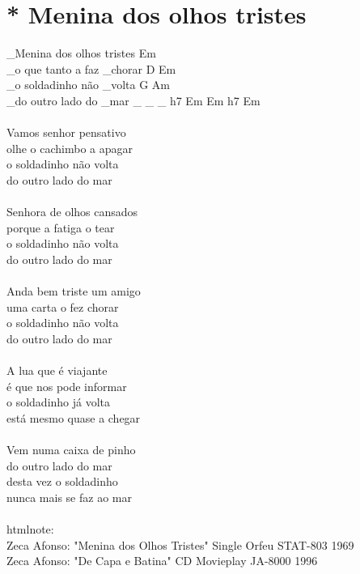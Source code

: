 \documentclass{article}
\begin{document}
\section{ * Menina dos olhos tristes}
_Menina dos olhos tristes             Em\\
_o que tanto a faz _chorar            D Em \\
_o soldadinho não _volta              G Am\\
_do outro lado do _mar _ _ _          h7 Em Em h7 Em\\
\\
Vamos senhor pensativo\\
olhe o cachimbo a apagar\\
o soldadinho não volta\\
do outro lado do mar\\
\\
Senhora de olhos cansados\\
porque a fatiga o tear\\
o soldadinho não volta\\
do outro lado do mar\\
\\
Anda bem triste um amigo\\
uma carta o fez chorar\\
o soldadinho não volta\\
do outro lado do mar\\
\\
A lua que é viajante\\
é que nos pode informar\\
o soldadinho já volta\\
está mesmo quase a chegar\\
\\
Vem numa caixa de pinho\\
do outro lado do mar\\
desta vez o soldadinho\\
nunca mais se faz ao mar\\
\\
htmlnote: \\
Zeca Afonso: "Menina dos Olhos Tristes"   Single Orfeu STAT-803   1969\\
Zeca Afonso: "De Capa e Batina"   CD Movieplay JA-8000    1996\\
\end{document}
